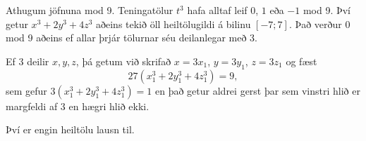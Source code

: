 Athugum jöfnuna mod 9.
Teningatölur $t^{3}$ hafa alltaf leif $0$, $1$ eða $-1$ mod 9.
Því getur $x^{3}+2y^{3}+4z^{3}$ aðeins tekið öll heiltölugildi á bilinu $[-7; 7]$. Það verður $0$ mod 9
aðeins ef allar þrjár tölurnar séu deilanlegar með 3.

Ef $3$ deilir $x,y,z$, þá getum við skrifað
$x=3x_{1}$, $y=3y_{1}$, $z=3z_{1}$ og fæst
\[
27(x_{1}^{3}+2y_{1}^{3}+4z_{1}^{3})=9,
\]
sem gefur $3(x_{1}^{3}+2y_{1}^{3}+4z_{1}^{3})=1$ en það getur aldrei gerst þar sem vinstri hlið er margfeldi af 3 en hægri hlið ekki.

Því er engin heiltölu lausn til.